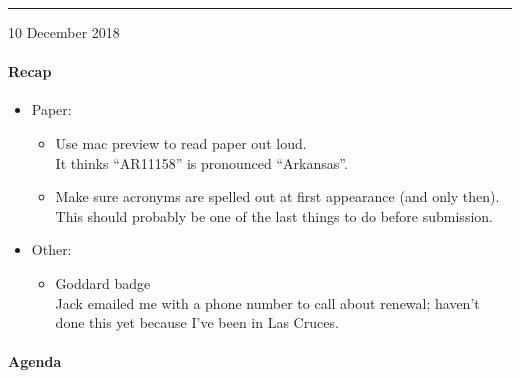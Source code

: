 \documentclass[]{article}
\newcommand{\mydate}[1]{\hrule\vspace{-1mm}\hfill{\small\color{blue}#1}}
\begin{document}
\begin{comment}
\backgroundsetup{
    color=black,
    opacity=0.1,
    angle=0,
    scale=4.0,
    hshift=-0.85in,
    contents={
        \begin{tikzpicture}%
            \draw [fill=gray, ultra thick, gray]
            (0,0.1\paperheight) rectangle (1.2,0.9\paperheight);
        \end{tikzpicture}}}
\end{comment}




\mydate{10 December 2018}

\paragraph{Recap}
\begin{itemize}
    \item Paper:
        \begin{itemize}
            \item Use mac preview to read paper out loud.\\
                It thinks ``AR11158'' is pronounced ``Arkansas''.
            \item Make sure acronyms are spelled out at first appearance (and
                only then).\\
                This should probably be one of the last things to do before
                submission.
        \end{itemize}
    \item Other:
        \begin{itemize}
            \item Goddard badge\\
                Jack emailed me with a phone number to call about renewal;
                haven't done this yet because I've been in Las Cruces.
        \end{itemize}
\end{itemize}


\paragraph{Agenda}
\end{document}
